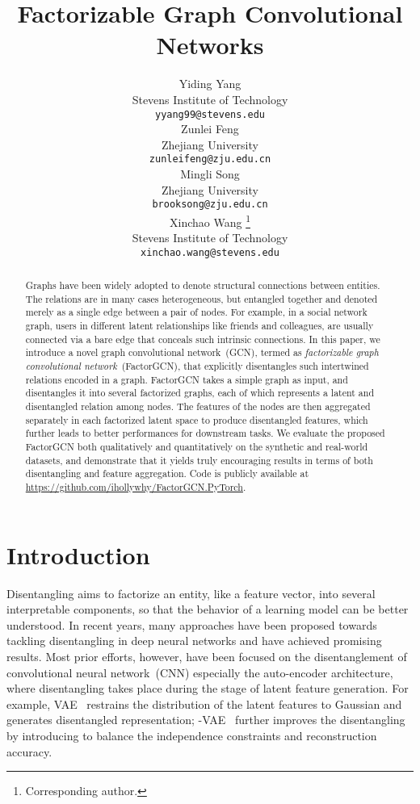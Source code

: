 \documentclass{article}
\title{Factorizable Graph Convolutional Networks}
\author{Yiding Yang \\ 
  Stevens Institute of Technology \\
  \texttt{yyang99@stevens.edu} \\
    \And
    Zunlei  Feng\\
    Zhejiang University \\
    \texttt{zunleifeng@zju.edu.cn} \\
    \And
    Mingli Song\\
    Zhejiang University \\
    \texttt{brooksong@zju.edu.cn} \\
    \And
    Xinchao Wang \thanks{Corresponding author.}\\
    Stevens Institute of Technology\\
    \texttt{xinchao.wang@stevens.edu}
}
\begin{document}
\maketitle

\begin{abstract}
Graphs have been widely adopted to 
denote structural connections between entities.
The relations are in many cases heterogeneous, 
but entangled together and denoted merely 
as a single edge  between a pair of nodes.
For example, in a social network graph, 
users in different latent relationships like friends and colleagues,
are usually connected via a bare edge that conceals 
such intrinsic connections.
In this paper, we introduce a
novel graph convolutional network~(GCN),
termed as \emph{factorizable graph convolutional network}~(FactorGCN),
that explicitly
disentangles such intertwined relations 
encoded in a graph.
FactorGCN takes a {simple graph} as input,
and disentangles it into several 
factorized graphs, each of which
represents a latent and disentangled relation among nodes.
The features of the nodes are then aggregated separately in each factorized latent space
to produce disentangled features,
which further leads to better performances for downstream tasks.
We evaluate the proposed FactorGCN both qualitatively and quantitatively
on the synthetic and real-world datasets,
and demonstrate that it yields truly encouraging results
in terms of both disentangling and feature aggregation. 
Code is publicly available at
\url{https://github.com/ihollywhy/FactorGCN.PyTorch}. 


 






\end{abstract}

\section{Introduction}


Disentangling aims to factorize an entity, like a feature vector, into several interpretable components, so that
the behavior of a learning model can be better understood. 
In recent years, many approaches have been proposed towards 
tackling disentangling in deep neural networks 
and have achieved promising results. 
Most prior efforts, however,
have been focused on the disentanglement of 
convolutional neural network~(CNN)
especially the auto-encoder architecture,
where disentangling takes place
during the stage of latent feature generation.
{For example,  VAE~\citep{kingma2013autovae}
restrains the distribution of the latent features
to Gaussian and generates disentangled
representation; -VAE~\citep{higgins2017betaVAE} further improves the disentangling by introducing  to balance the 
independence constraints and reconstruction accuracy.}
\end{document}
